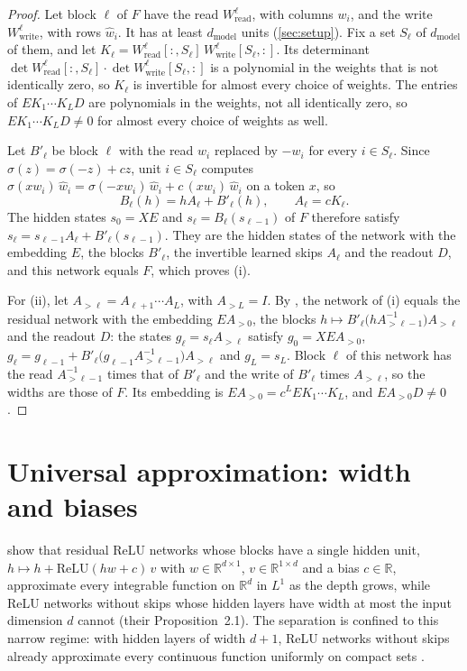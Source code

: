 \documentclass[10pt]{article}
\theoremstyle{definition}
\theoremstyle{remark}
\newcommand{\R}{\mathbb{R}}
\newcommand{\Wread}{W_{\mathrm{read}}}
\newcommand{\Wwrite}{W_{\mathrm{write}}}
\newcommand{\dm}{d_{\mathrm{model}}}
\begin{document}
\begin{proof}
Let block $\ell$ of $F$ have the read $\Wread^{\ell}$, with columns $w_i$, and the write $\Wwrite^{\ell}$, with rows $\hat w_i$. It has at least $\dm$ units (\cref{sec:setup}). Fix a set $S_\ell$ of $\dm$ of them, and let $K_\ell = \Wread^{\ell}[{:},S_\ell]\,\Wwrite^{\ell}[S_\ell,{:}]$. Its determinant $\det\Wread^{\ell}[{:},S_\ell]\cdot\det\Wwrite^{\ell}[S_\ell,{:}]$ is a polynomial in the weights that is not identically zero, so $K_\ell$ is invertible for almost every choice of weights. The entries of $EK_1\cdots K_LD$ are polynomials in the weights, not all identically zero, so $EK_1\cdots K_LD \neq 0$ for almost every choice of weights as well.

Let $B'_\ell$ be block $\ell$ with the read $w_i$ replaced by $-w_i$ for every $i \in S_\ell$. Since $\sigma(z) = \sigma(-z) + cz$, unit $i \in S_\ell$ computes $\sigma(xw_i)\,\hat w_i = \sigma(-xw_i)\,\hat w_i + c\,(xw_i)\,\hat w_i$ on a token $x$, so
\[
B_\ell(h) = hA_\ell + B'_\ell(h), \qquad A_\ell = cK_\ell.
\]
The hidden states $s_0 = XE$ and $s_\ell = B_\ell(s_{\ell-1})$ of $F$ therefore satisfy $s_\ell = s_{\ell-1}A_\ell + B'_\ell(s_{\ell-1})$. They are the hidden states of the network with the embedding $E$, the blocks $B'_\ell$, the invertible learned skips $A_\ell$ and the readout $D$, and this network equals $F$, which proves (i).

For (ii), let $A_{>\ell} = A_{\ell+1}\cdots A_L$, with $A_{>L} = I$. By \citet[Theorem~3.2(i)]{karbevski2026unlock}, the network of (i) equals the residual network with the embedding $EA_{>0}$, the blocks $h \mapsto B'_\ell\big(hA_{>\ell-1}^{-1}\big)A_{>\ell}$ and the readout $D$: the states $g_\ell = s_\ell A_{>\ell}$ satisfy $g_0 = XEA_{>0}$, $g_\ell = g_{\ell-1} + B'_\ell\big(g_{\ell-1}A_{>\ell-1}^{-1}\big)A_{>\ell}$ and $g_L = s_L$. Block $\ell$ of this network has the read $A_{>\ell-1}^{-1}$ times that of $B'_\ell$ and the write of $B'_\ell$ times $A_{>\ell}$, so the widths are those of $F$. Its embedding is $EA_{>0} = c^LEK_1\cdots K_L$, and $EA_{>0}D \neq 0$.
\end{proof}


\section{Universal approximation: width and biases}\label{app:universal}

\citet{lin2018resnet} show that residual ReLU networks whose blocks have a single hidden unit, $h \mapsto h + \mathrm{ReLU}(hw + c)\,v$ with $w \in \R^{d\times 1}$, $v \in \R^{1\times d}$ and a bias $c \in \R$, approximate every integrable function on $\R^d$ in $L^1$ as the depth grows, while ReLU networks without skips whose hidden layers have width at most the input dimension $d$ cannot (their Proposition~2.1). The separation is confined to this narrow regime: with hidden layers of width $d + 1$, ReLU networks without skips already approximate every continuous function uniformly on compact sets \citep{hanin2017approximating}.
\end{document}
